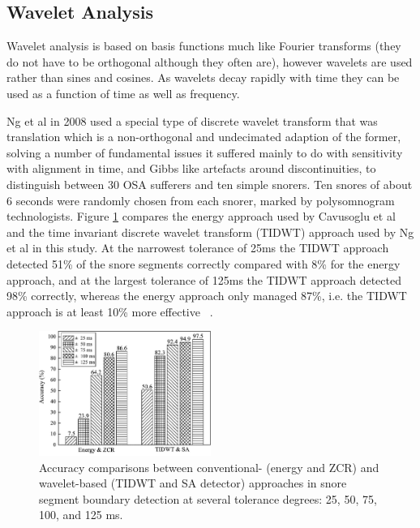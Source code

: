 \subsection{Wavelet Analysis}
Wavelet analysis is based on basis functions much like Fourier transforms (they do not have to be orthogonal although they often are), however wavelets are used rather than sines and cosines. As wavelets decay rapidly with time they can be used as a function of time as well as frequency.

Ng et al in 2008 used a special type of discrete wavelet transform that was translation which is a non-orthogonal and undecimated adaption of the former, solving a number of fundamental issues it suffered mainly to do with sensitivity with alignment in time, and Gibbs like artefacts around discontinuities, to distinguish between 30 OSA sufferers and ten simple snorers. Ten snores of about 6 seconds were randomly chosen from each snorer, marked by polysomnogram technologists. Figure \ref{fig:ng2008bfig5} compares the energy approach used by Cavusoglu et al and the time invariant discrete wavelet transform (TIDWT) approach used by Ng et al in this study. At the narrowest tolerance of 25ms the TIDWT approach detected 51\% of the snore segments correctly compared with 8\% for the energy approach, and at the largest tolerance of 125ms the TIDWT approach detected 98\% correctly, whereas the energy approach only managed 87\%, i.e. the TIDWT approach is at least 10\% more effective ~\cite{ng2008snore}.


\begin{figure}[h]
\centering 
\includegraphics[width=0.5\textwidth]{drawings/ng2008bfig5}
\caption{Accuracy comparisons between conventional- (energy and ZCR) and wavelet-based (TIDWT and SA detector) approaches in snore segment boundary detection at several tolerance degrees: 25, 50, 75, 100, and 125 ms. ~\cite{ng2008snore}}
\label{fig:ng2008bfig5}
\end{figure}

